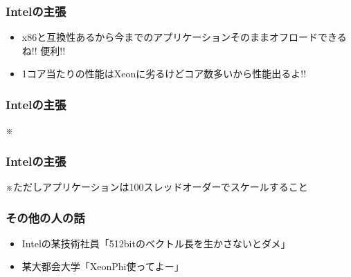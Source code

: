 \documentclass[dvipdfmx,20pt,notheorems,t]{beamer}
\begin{document}
\begin{frame}\frametitle{Intelの主張}
\begin{itemize}
\item x86と互換性あるから今までのアプリケーションそのままオフロードできるね!! 便利!!
\item 1コア当たりの性能はXeonに劣るけどコア数多いから性能出るよ!!
\end{itemize}
\end{frame}

\begin{frame}\frametitle{Intelの主張}
\Large
※
\end{frame}

\begin{frame}\frametitle{Intelの主張}
※ただしアプリケーションは100スレッドオーダーでスケールすること
\end{frame}

\begin{frame}\frametitle{その他の人の話}
\begin{itemize}
\item Intelの某技術社員「512bitのベクトル長を生かさないとダメ」
\item 某大都会大学「XeonPhi使ってよー」
\end{itemize}
\end{frame}
\end{document}
